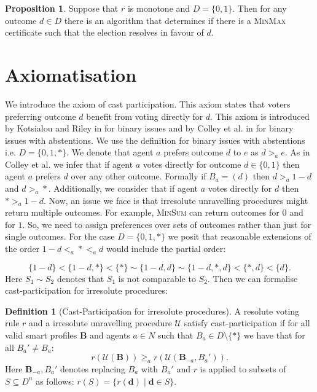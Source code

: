 \documentclass[11pt,a4paper, titlepage]{article}
\theoremstyle{definition}
\newtheorem{definition}[theorem]{Definition}
\newtheorem{proposition}[theorem]{Proposition}
\let\vec\mathbf
\begin{document}
\begin{proposition}
    Suppose that $r$ is monotone and $D = \{0, 1\}$. Then for any outcome $d \in D$ there is an algorithm that determines if there is a \textsc{MinMax} certificate such that the election resolves in favour of $d$.
\end{proposition}
\newpage
\section{Axiomatisation}

We introduce the axiom of cast participation. This axiom states that voters preferring outcome $d$ benefit from voting directly for $d$. 
This axiom is introduced by Kotsialou and Riley in \cite{kotsialou} for binary issues and by Colley et al. in \cite{grandi} for binary issues with abstentions. 
We use the definition for binary issues with abstentions i.e. $D = \{0, 1, *\}$.
We denote that agent $a$ prefers outcome $d$ to $e$ as $d >_a e$. As in Colley et al. we infer that if agent $a$ votes directly for outcome $d \in \{0, 1\}$ then agent $a$ prefers $d$ over any other outcome. 
Formally if $B_a = (d)$ then $ d >_a 1-d$ and $d >_a *$.
Additionally, we consider that if agent $a$ votes directly for $d$ then $* >_a 1-d$.
Now, an issue we face is that irresolute unravelling procedures might return multiple outcomes. 
For example, \textsc{MinSum} can return outcomes for $0$ and for $1$.
So, we need to assign preferences over sets of outcomes rather than just for single outcomes.
For the case $D = \{0, 1, *\}$ we posit that reasonable extensions of the order $1-d <_a * <_a d$ would include the partial order:

\[
    \{1-d\} < \{1-d, *\} < \{*\} \sim \{1-d, d\} \sim \{1-d, *, d\} < \{*, d \}< \{d\}.
\]
Here $S_1 \sim S_2$ denotes that $S_1$ is not comparable to $S_2$.
Then we can formalise cast-participation for irresolute procedures:

\begin{definition}[Cast-Participation for irresolute procedures]
    A resolute voting rule $r$ and a irresolute unravelling procedure $\mathcal{U}$ satisfy cast-participation if for all valid smart profiles $\mathbf{B}$ and agents $a \in N$ such that $B_a \in D \setminus \{*\}$ we have that for all $B_a' \neq B_a$:
    \[
        r(\mathcal{U}(\mathbf{B})) \geq_a r(\mathcal{U}(\mathbf{B}_{-a}, B_a')).
    \]
    Here $\mathbf{B}_{-a}, B_a'$ denotes replacing $B_a$ with $B_a'$ and $r$ is applied to subsets of $S \subseteq D^n$ as follows: $r(S) = \{r(\vec{d}) \mid \vec{d} \in S\}$.
\end{definition}
\end{document}
